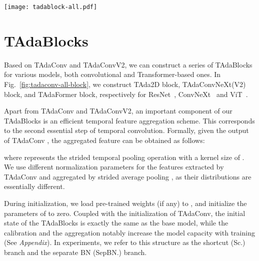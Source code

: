 \documentclass[10pt,journal,compsoc]{IEEEtran}
\begin{document}
\begin{figure*}[t]
\centering
\texttt{[image: tadablock-all.pdf]}
\vspace{-4mm}
\caption{
\textbf{TAdaBlock designs for both convolutional and transformer-based models.} For convolutional models, we constructed TAda2D block in (a) and TAdaConvNeXt block in (b) in our preliminary version~\cite{huangtada}. Inspired by the efficient temporal aggregation in TAda2D, we introduce a similar strided temporal pooling (T-Pool in the figure) and a separate normalization layer to the TAdaConvNeXtV2 block in (c). For transformer-based models, we insert a TAdaBlock before each multi-head self-attention operation in the TAdaFormer block in (d), where the TAdaBlock is composed of two pointwise convolutions, a depth-wise TAdaConvV2, and a temporal feature aggregation module. 
}
\vspace{-2mm}
\label{fig:tadaconv-all-block}
\end{figure*}

\section{TAdaBlocks}
\label{Sec:TempAgg}
Based on TAdaConv and TAdaConvV2, we can construct a series of TAdaBlocks for various models, both convolutional and Transformer-based ones. In Fig.~\ref{fig:tadaconv-all-block}, we construct TAda2D block, TAdaConvNeXt(V2) block, and TAdaFormer block, respectively for ResNet~\cite{resnet}, ConvNeXt~\cite{convnext} and ViT~\cite{dosovitskiy2020vit}.

Apart from TAdaConv and TAdaConvV2, an important component of our TAdaBlocks is an efficient temporal feature aggregation scheme. This corresponds to the second essential step of temporal convolution. 
Formally, given the output of TAdaConv , the aggregated feature can be obtained as follows:

\noindent where  represents the strided temporal pooling operation with a kernel size of . 
We use different normalization parameters for the features extracted by TAdaConv  and aggregated by strided average pooling , as their distributions are essentially different. 

During initialization, we load pre-trained weights (if any) to , and initialize the parameters of  to zero. 
Coupled with the initialization of TAdaConv, the initial state of the TAdaBlocks is exactly the same as the base model, while the calibration and the aggregation notably increase the model capacity with training (See \textit{Appendix}).
In experiments, we refer to this structure as the shortcut (Sc.) branch and the separate BN (SepBN.) branch.
\end{document}
